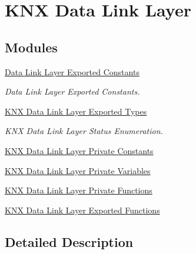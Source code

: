 \hypertarget{group___k_n_x___d_l}{}\section{K\+NX Data Link Layer}
\label{group___k_n_x___d_l}
\subsection*{Modules}
\begin{DoxyCompactItemize}
\item 
\hyperlink{group___d_l___exported___constants}{Data Link Layer Exported Constants}
\begin{DoxyCompactList}\small\item\em Data Link Layer Exported Constants. \end{DoxyCompactList}\item 
\hyperlink{group___k_n_x___d_l___exported___types}{K\+N\+X Data Link Layer Exported Types}
\begin{DoxyCompactList}\small\item\em K\+NX Data Link Layer Status Enumeration. \end{DoxyCompactList}\item 
\hyperlink{group___k_n_x___d_l___private___consts}{K\+N\+X Data Link Layer Private Constants}
\item 
\hyperlink{group___k_n_x___d_l___private___variables}{K\+N\+X Data Link Layer Private Variables}
\item 
\hyperlink{group___k_n_x___d_l___private___functions}{K\+N\+X Data Link Layer Private Functions}
\item 
\hyperlink{group___k_n_x___d_l___exported___functions}{K\+N\+X Data Link Layer Exported Functions}
\end{DoxyCompactItemize}


\subsection{Detailed Description}
